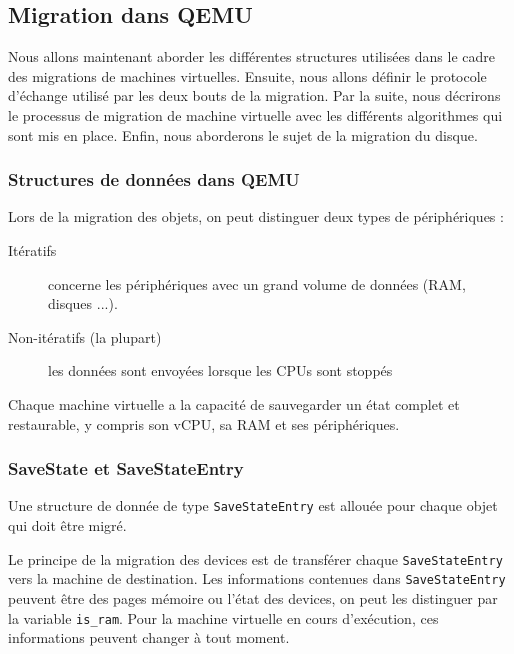 \subsection{Migration dans QEMU}
Nous allons maintenant aborder les différentes structures utilisées dans le cadre des migrations de machines virtuelles.
Ensuite, nous allons définir le protocole d'échange utilisé par les deux bouts de la migration.
Par la suite, nous décrirons le processus de migration de machine virtuelle avec les différents algorithmes qui sont mis en place.
Enfin, nous aborderons le sujet de la migration du disque.

\subsubsection{Structures de données dans QEMU}

Lors de la migration des objets, on peut distinguer deux types de périphériques :
\begin{description}
\item[Itératifs] concerne les périphériques avec un grand volume de données (RAM, disques ...).
\item[Non-itératifs (la plupart)] les données sont envoyées lorsque les CPUs sont stoppés
\end{description}

Chaque machine virtuelle a la capacité de sauvegarder un état complet et restaurable, y compris son vCPU, sa RAM et ses périphériques.

\subsubsection*{SaveState et SaveStateEntry}
Une structure de donnée de type \texttt{SaveStateEntry} est allouée pour chaque objet qui doit être migré.

Le principe de la migration des devices est de transférer chaque \texttt{SaveStateEntry} vers la machine de destination. 
Les informations contenues dans \texttt{SaveStateEntry} peuvent être des pages mémoire ou l'état des devices, on peut les distinguer par la variable \texttt{is\_ram}. 
Pour la machine virtuelle en cours d'exécution, ces informations peuvent changer à tout moment.

